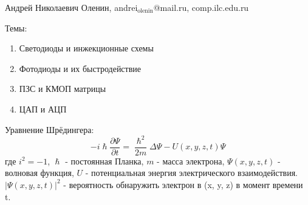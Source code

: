 \documentclass[11pt]{article}
\author{Sergey Makarov}
\date{\today}
\title{}
\def\zall{\setcounter{lem}{0}\setcounter{cnsqnc}{0}\setcounter{th}{0}\setcounter{Cmt}{0}\setcounter{equation}{0}}
\newcounter{lem}\setcounter{lem}{0}
\newcounter{th}\setcounter{th}{0}
\newcounter{cnsqnc}\setcounter{cnsqnc}{0}
\newcounter{Cmt}\setcounter{Cmt}{0}
\begin{document}
\zall

Андрей Николаевич Оленин, andrei\(_{\text{olenin}}\)@mail.ru, comp.ilc.edu.ru

Темы:
\begin{enumerate}
\item Светодиоды и инжекционные схемы
\item Фотодиоды и их быстродействие
\item ПЗС и КМОП матрицы
\item ЦАП и АЦП
\end{enumerate}

Уравнение Шрёдингера:
\begin{equation}
-i\hslash\frac{\partial\Psi}{\partial t} = \frac{\hslash^2}{2m}\Delta\Psi - U(x, y, z, t)\Psi
\end{equation}
где
$i^2 = -1$, $\hslash$ - постоянная Планка, $m$ - масса электрона, $\Psi(x, y, z, t)$ - волновая функция,
$U$ - потенциальная энергия электрического взаимодействия.
$|\Psi(x, y, z, t)|^2$ - вероятность обнаружить электрон в (x, y, z) в момент времени t.
\end{document}
